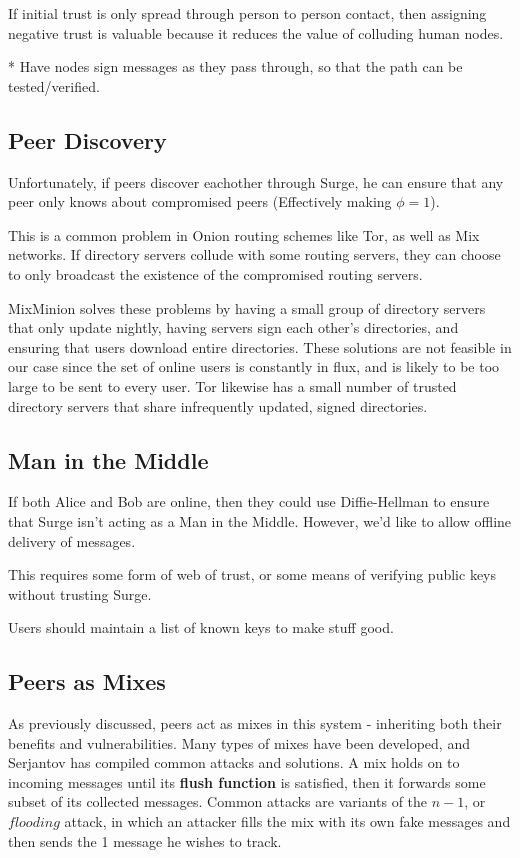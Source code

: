 \documentclass[twocolumn,11pt,english]{article}
\begin{document}
If initial trust is only spread through person to person contact, then assigning negative trust is valuable because it reduces the value of colluding human nodes. 

* Have nodes sign messages as they pass through, so that the path can be tested/verified. 

\subsection{Peer Discovery}
Unfortunately, if peers discover eachother through Surge, he can ensure that any peer only knows about compromised peers (Effectively making $\phi = 1$).

This is a common problem in Onion routing schemes like Tor, as well as Mix networks. If directory servers collude with some routing servers, they can choose to only broadcast the existence of the compromised routing servers.

MixMinion \cite{minion-design} solves these problems by having a small group of directory servers that only update nightly, having servers sign each other's directories, and ensuring that users download entire directories. These solutions are not feasible in our case since the set of online users is constantly in flux, and is likely to be too large to be sent to every user. Tor \cite{tor-design} likewise has a small number of trusted directory servers that share infrequently updated, signed directories.



\subsection{Man in the Middle} If both Alice and Bob are online, then they could use Diffie-Hellman to ensure that Surge isn't acting as a Man in the Middle. However, we'd like to allow offline delivery of messages.

This requires some form of web of trust, or some means of verifying public keys without trusting Surge. 

Users should maintain a list of known keys to make stuff good. 

\subsection{Peers as Mixes}
As previously discussed, peers act as mixes in this system - inheriting both their benefits and vulnerabilities. Many types of mixes have been developed, and Serjantov \cite{trickle02} has compiled common attacks and solutions. 
A mix holds on to incoming messages until its \textbf{flush function} is satisfied, then it forwards some subset of its collected messages. Common attacks are variants of the $n - 1$, or $flooding$ attack, in which an attacker fills the mix with its own fake messages and then sends the 1 message he wishes to track. 
\end{document}
